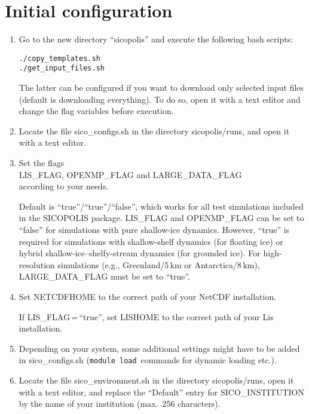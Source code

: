 \documentclass[12pt,a4paper]{article}
\begin{document}

\section{Initial configuration}

\begin{enumerate}

\item Go to the new directory ``sicopolis'' and execute the following bash scripts:

\hspace*{1.5em}\verb+./copy_templates.sh+
\\
\hspace*{1.5em}\verb+./get_input_files.sh+

The latter can be configured if you want to download only selected input files (default is downloading everything). To do so, open it with a text editor and change the flag variables before execution.

\item Locate the file sico\_configs.sh in the directory sicopolis/runs, and open it with a text editor.

\item Set the flags
\\
LIS\_FLAG, OPENMP\_FLAG and LARGE\_DATA\_\-FLAG 
\\
according to your needs. 

Default is ``true''/``true''/``false'', which works for all test simulations included in the SICOPOLIS package. LIS\_FLAG and OPENMP\_FLAG can be set to ``false'' for simulations with pure shallow-ice dynamics. However, ``true'' is required for simulations with shallow-shelf dynamics (for floating ice) or hybrid shallow-ice--shelfy-stream dynamics (for grounded ice). For high-resolution simulations (e.g., Greenland/5\,km or Antarctica/8\,km), LARGE\_DATA\_FLAG must be set to ``true''.

\item Set NETCDFHOME to the correct path of your NetCDF installation.

If LIS\_FLAG\,=\,``true'', set LISHOME to the correct path of your Lis installation.

\item Depending on your system, some additional settings might have to be added in sico\_configs.sh (\verb+module load+\, commands for dynamic loading etc.).

\item Locate the file sico\_environment.sh in the directory sicopolis/runs, open it with a text editor, and replace the ``Default'' entry for SICO\_INSTITUTION by the name of your institution (max.\ 256 characters).

\end{enumerate}
\end{document}
